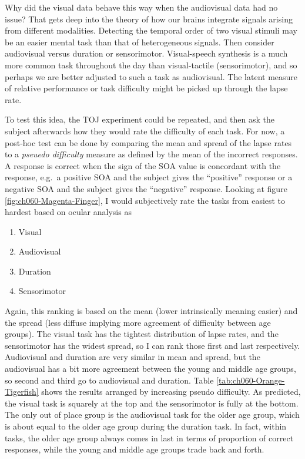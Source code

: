 \documentclass[11pt, oneside, openany]{scrbook}
\providecommand{\tightlist}{%
  \setlength{\itemsep}{0pt}\setlength{\parskip}{0pt}}
\begin{document}
Why did the visual data behave this way when the audiovisual data had no issue? That gets deep into the theory of how our brains integrate signals arising from different modalities. Detecting the temporal order of two visual stimuli may be an easier mental task than that of heterogeneous signals. Then consider audiovisual versus duration or sensorimotor. Visual-speech synthesis is a much more common task throughout the day than visual-tactile (sensorimotor), and so perhaps we are better adjusted to such a task as audiovisual. The latent measure of relative performance or task difficulty might be picked up through the lapse rate.

To test this idea, the TOJ experiment could be repeated, and then ask the subject afterwards how they would rate the difficulty of each task. For now, a post-hoc test can be done by comparing the mean and spread of the lapse rates to a \emph{pseuedo difficulty} measure as defined by the mean of the incorrect responses. A response is correct when the sign of the SOA value is concordant with the response, e.g.~a positive SOA and the subject gives the ``positive'' response or a negative SOA and the subject gives the ``negative'' response. Looking at figure \ref{fig:ch060-Magenta-Finger}, I would subjectively rate the tasks from easiest to hardest based on ocular analysis as

\begin{enumerate}
\def\labelenumi{\arabic{enumi}.}
\tightlist
\item
  Visual
\item
  Audiovisual
\item
  Duration
\item
  Sensorimotor
\end{enumerate}

Again, this ranking is based on the mean (lower intrinsically meaning easier) and the spread (less diffuse implying more agreement of difficulty between age groups). The visual task has the tightest distribution of lapse rates, and the sensorimotor has the widest spread, so I can rank those first and last respectively. Audiovisual and duration are very similar in mean and spread, but the audiovisual has a bit more agreement between the young and middle age groups, so second and third go to audiovisual and duration. Table \ref{tab:ch060-Orange-Tigerfish} shows the results arranged by increasing pseudo difficulty. As predicted, the visual task is squarely at the top and the sensorimotor is fully at the bottom. The only out of place group is the audiovisual task for the older age group, which is about equal to the older age group during the duration task. In fact, within tasks, the older age group always comes in last in terms of proportion of correct responses, while the young and middle age groups trade back and forth.
\end{document}
